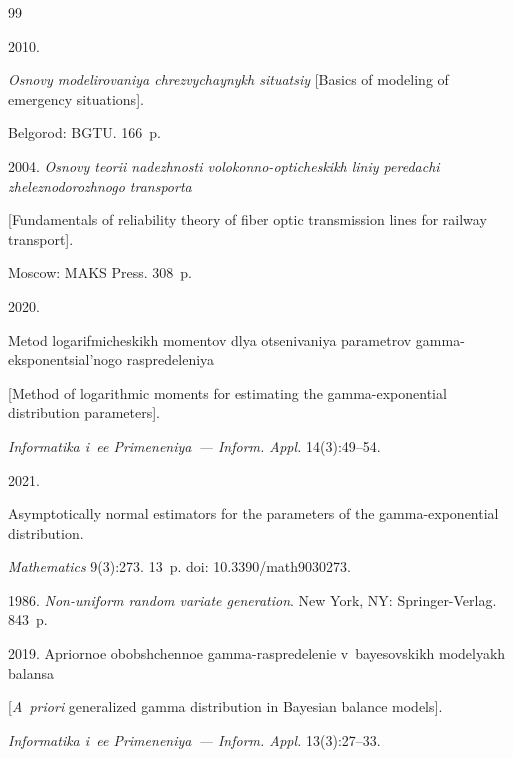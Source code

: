 {{\begin{thebibliography}{99}


 2010. 


\textit{Osnovy modelirovaniya chrezvychaynykh situatsiy} [Basics of modeling of emergency situations]. 


Belgorod: BGTU. 166~p.






 2004. \textit{Osnovy teorii nadezhnosti volokonno-opticheskikh liniy peredachi zheleznodorozhnogo transporta} 


 [Fundamentals of reliability theory of fiber optic transmission lines for railway transport].


  Moscow: MAKS Press. 308~p.




 2020. 


Metod logarifmicheskikh momentov dlya otsenivaniya parametrov gamma-eksponentsial'nogo raspredeleniya 


[Method of logarithmic moments for estimating the gamma-exponential distribution parameters]. 


\textit{Informatika i~ee Primeneniya~--- Inform. Appl.} 14(3):49--54.




 2021. 


Asymptotically normal estimators for the parameters of the gamma-exponential distribution.


\textit{Mathematics} 9(3):273. 13~p. doi: 10.3390\!/\!math9030273.




 1986. \textit{Non-uniform random variate generation}. New York, NY: Springer-Verlag. 843~p.






 2019. Apriornoe obobshchennoe gamma-raspredelenie v~bayesovskikh modelyakh balansa 


 [\textit{A~priori} generalized gamma distribution in Bayesian balance models]. 


 \textit{Informatika i~ee Primeneniya~--- Inform. Appl.} 13(3):27--33.





\end{thebibliography}}}
